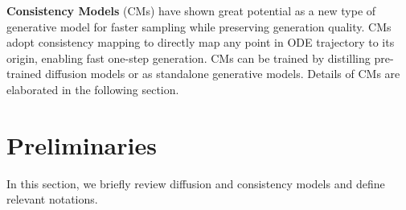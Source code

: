 \documentclass{article} %
\begin{document}
\noindent \textbf{Consistency Models} (CMs) \citep{song2023consistency} have shown great potential as a new type of generative model for faster sampling while preserving generation quality. 
CMs adopt consistency mapping to directly map any point in ODE trajectory to its origin, enabling fast one-step generation. 
CMs can be trained by distilling pre-trained diffusion models or as standalone generative models. Details of CMs are elaborated in the following section.

\vspace{-10pt}
\section{Preliminaries}
\vspace{-5pt}
In this section, we briefly review diffusion and consistency models and define relevant notations.
\end{document}
